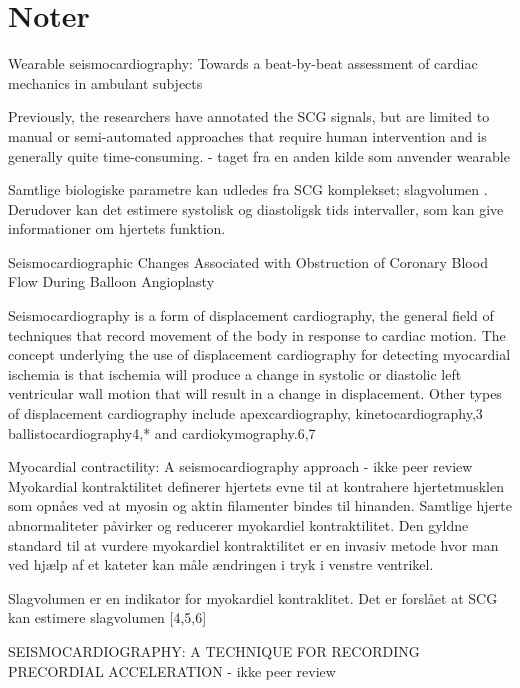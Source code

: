 \section{Noter}



Wearable seismocardiography: Towards a beat-by-beat assessment of
cardiac mechanics in ambulant subjects

Previously, the researchers have annotated the SCG signals, but are limited to manual or semi-automated approaches that require human intervention and is generally quite time-consuming. - taget fra en anden kilde som anvender wearable 




Samtlige biologiske parametre kan udledes fra SCG komplekset; slagvolumen \citep{TavakolianVenter2009}. Derudover kan det estimere systolisk og diastoligsk tids intervaller, som kan give informationer om hjertets funktion. 

Seismocardiographic Changes Associated with
Obstruction of Coronary Blood Flow
During Balloon Angioplasty 



Seismocardiography is a form of displacement cardiography, the general field of techniques that record movement of the body in response to cardiac motion. The concept underlying the use of displacement cardiography for detecting myocardial
ischemia is that ischemia will produce a change in systolic or diastolic left ventricular wall motion that will result in a change in displacement. Other types of displacement cardiography include apexcardiography, kinetocardiography,3 ballistocardiography4,* and cardiokymography.6,7



Myocardial contractility: A seismocardiography approach - ikke peer review
Myokardial kontraktilitet definerer hjertets evne til at kontrahere hjertetmusklen som opnåes ved at myosin og aktin filamenter bindes til hinanden. Samtlige hjerte abnormaliteter påvirker og reducerer myokardiel kontraktilitet. Den gyldne standard til at vurdere myokardiel kontraktilitet er en invasiv metode hvor man ved hjælp af et kateter kan måle ændringen i tryk i venstre ventrikel. 

Slagvolumen er en indikator for myokardiel kontraklitet. Det er forslået at SCG kan estimere slagvolumen [4,5,6]



SEISMOCARDIOGRAPHY: A TECHNIQUE FOR RECORDING
PRECORDIAL ACCELERATION - ikke peer review

